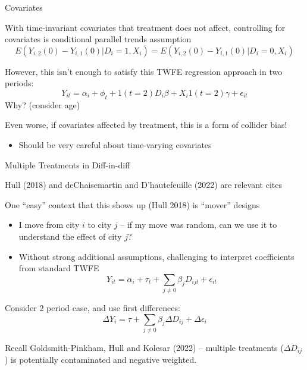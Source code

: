 \documentclass[notes,11pt, aspectratio=169]{beamer}
\newenvironment{wideitemize}{\itemize\addtolength{\itemsep}{10pt}}{\enditemize}
\begin{document}

\begin{frame}{Covariates}
  \begin{wideitemize}
  \item With time-invariant covariates that treatment does not affect,
    controlling for covariates is conditional parallel trends
    assumption
    \begin{equation}
      E(Y_{i,2}(0)-Y_{i,1}(0) | D_{i} = 1, X_{i}) =       E(Y_{i,2}(0)-Y_{i,1}(0) | D_{i} = 0, X_{i})
    \end{equation}
  \item However, this isn't enough to satisfy this TWFE regression approach in two periods:
    \begin{equation}
      Y_{it} = \alpha_{i} + \phi_{t} + 1(t=2)D_{i}\beta + X_{i}1(t = 2)\gamma + \epsilon_{it}
    \end{equation}
    Why? (consider age)
  \item Even worse, if covariates affected by treatment, this is a form of
    collider bias!
    \begin{itemize}
    \item Should be very careful about time-varying covariates
    \end{itemize}
  \end{wideitemize}
\end{frame}


\begin{frame}{Multiple Treatments in Diff-in-diff}
  \begin{wideitemize}
  \item Hull (2018) and deChaisemartin and D'hautefeuille (2022) are relevant cites
  \item One ``easy'' context that this shows up (Hull 2018) is ``mover'' designs
    \begin{itemize}
    \item I move from city $i$ to city $j$ -- if my move was random,
      can we use it to understand the effect of city $j$?
    \item Without strong additional assumptions, challenging to
      interpret coefficients from standard TWFE
      \begin{equation}
        Y_{it} = \alpha_{i} + \tau_{t} + \sum_{j\not=0}\beta_{j}D_{ijt} + \epsilon_{it}
      \end{equation}
    \end{itemize}
  \item Consider 2 period case, and use first differences:
    \begin{equation}
      \Delta Y_{i} = \tau + \sum_{j\not=0}\beta_{j}\Delta D_{ij} + \Delta\epsilon_{i}
    \end{equation}
  \item Recall Goldsmith-Pinkham, Hull and Kolesar (2022) -- multiple
    treatments ($\Delta D_{ij}$) is potentially contaminated and
    negative weighted.
  \end{wideitemize}
\end{frame}
\end{document}
